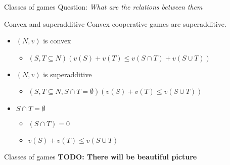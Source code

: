 \documentclass{beamer}
\begin{document}


\begin{frame}{Classes of games}
    Question: \textit{What are the relations between them}
	\begin{block}{Convex and superadditive}
		Convex cooperative games are superadditive.
	\end{block}
	\begin{itemize}
		\item<2-> $(N,v)$ is convex
		\begin{itemize}
			\item<2-> $\left(S,T \subseteq N\right)\left(v(S)+v(T) \leq v\left(S \cap T\right)+v\left(S \cup T\right)\right)$
		\end{itemize}
		\item<3-> $(N,v)$ is superadditive
		\begin{itemize}
			\item<3-> $\left(S,T \subseteq N, S \cap T = \emptyset\right)\left(v(S)+v(T) \leq v\left(S \cup T\right)\right)$
		\end{itemize}
		\item<4-> $S \cap T = \emptyset$
		\begin{itemize}
			\item<4-> $\left(S \cap T\right) = 0$
			\item<4-> $v(S)+v(T) \leq v\left(S \cup T\right)$
		\end{itemize}
	\end{itemize}
\end{frame}



\begin{frame}{Classes of games}
    \textbf{TODO: There will be beautiful picture}
\end{frame}


\end{document}
